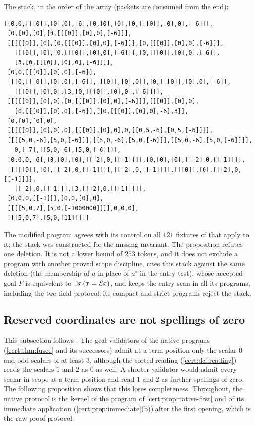 The stack, in the order of the array (packets are consumed from the end):
{\small
\begin{verbatim}
[[0,0,[[[0]],[0],0],-6],[0,[0],[0],[0,[[[0]],[0],0],[-6]]],
 [0,[0],[0],[0,[[[0]],[0],0],[-6]]],
 [[[[[0]],[0],[0,[[[0]],[0],0],[-6]]],[0,[[[0]],[0],0],[-6]]],
   [[[0]],[0],[0,[[[0]],[0],0],[-6]]],[0,[[[0]],[0],0],[-6]],
   [3,[0,[[[0]],[0],0],[-6]]]],
 [0,0,[[[0]],[0],0],[-6]],
 [[[0,[[[0]],[0],0],[-6]],[[[0]],[0],0]],[0,[[[0]],[0],0],[-6]],
   [[[0]],[0],0],[3,[0,[[[0]],[0],0],[-6]]]],
 [[[[[0]],[0],0],[0,[[[0]],[0],0],[-6]]],[[[0]],[0],0],
   [0,[[[0]],[0],0],[-6]],[[0,[[[0]],[0],0],-6],3]],
 [0,[0],[0],0],
 [[[[[0]],[0],0],0],[[[0]],[0],0],0,[[0,5,-6],[0,5,[-6]]]],
 [[[[5,0,-6],[5,0,[-6]]],[[5,0,-6],[5,0,[-6]]],[[5,0,-6],[5,0,[-6]]]],
   0,[-7],[[5,0,-6],[5,0,[-6]]]],
 [0,0,0,-6],[0,[0],[0],[[-2],0,[[-1]]]],[0,[0],[0],[[-2],0,[[-1]]]],
 [[[[[0]],[0],[[-2],0,[[-1]]]],[[-2],0,[[-1]]]],[[[0]],[0],[[-2],0,[[-1]]]],
   [[-2],0,[[-1]]],[3,[[-2],0,[[-1]]]]],
 [0,0,0,[[-1]]],[0,0,[0],0],
 [[[[5,0,7],[5,0,[-1000000]]]],0,0,0],
 [[[5,0,7],[5,0,[11]]]]]
\end{verbatim}}
The modified program agrees with its control on all $121$ fixtures of
 that apply to it; the stack was constructed for the
missing invariant. The proposition refutes one deletion. It is not a lower
bound of $253$ tokens, and it does not exclude a program with another proved
scope discipline.  cites this stack against the same
deletion (the membership of $a$ in place of $a^{\circ}$ in the entry test),
whose accepted goal $F$ is equivalent to $\exists x\,(x=S x)$, and keeps
the entry scan in all its programs, including the two-field protocol; its
compact and strict programs reject the stack.

\subsection{Reserved coordinates are not spellings of zero}\label{cert:sec:reserved}

This subsection follows . The goal validators of
the native programs (\cref{cert:thm:fused} and its successors) admit at a term
position only the scalar $0$ and odd scalars of at least $3$, although the
sorted reading (\cref{cert:def:reading}) reads the scalars $1$ and $2$ as $0$
as well. A shorter validator would admit every scalar in scope at a term
position and read $1$ and $2$ as further spellings of zero. The
following proposition shows that this loses completeness. Throughout, the
native protocol is the kernel of the program of \cref{cert:prop:native-first}
and of its immediate application (\cref{cert:prop:immediate}(b)) after the
first opening, which is the raw proof protocol.

